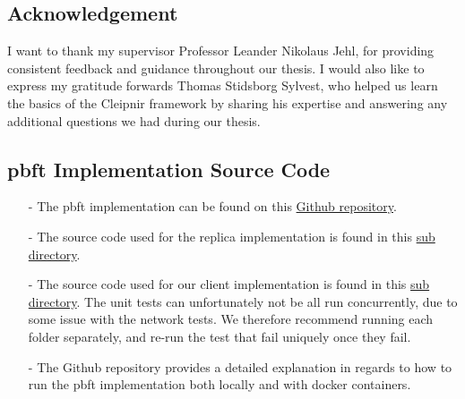 \documentclass[12pt, a4paper]{report}
\numberwithin{figure}{section}
\numberwithin{table}{section}
\begin{document}
	\section*{Acknowledgement}
I want to thank my supervisor Professor Leander Nikolaus Jehl, for providing consistent feedback and guidance throughout our thesis. I would also like to express my gratitude forwards Thomas Stidsborg Sylvest, who helped us learn the basics of the Cleipnir framework by sharing his expertise and answering any additional questions we had during our thesis.	
	
	\newpage		
	
	\printacronyms
	
	\setlength{\parindent}{0em} 
	
	
	
	
	
	
		
	
		
	
		
	
		
	
		
	
	
	
\listoffigures
\lstlistoflistings

\newpage
\begin{appendices}
	\chapter{\ac{pbft} Implementation Source Code}
	\begin{itemize}
		\item[-] The \ac{pbft} implementation can be found on this \href{https://github.com/Lupu2/PBFT-Master}{Github repository}.
		\item[-] The source code used for the replica implementation is found in this \href{https://github.com/Lupu2/PBFT-Master/tree/main/PBFT}{sub directory}.
		\item[-] The source code used for our client implementation is found in this \href{https://github.com/Lupu2/PBFT-Master/tree/main/PBFTClient}{sub directory}. The unit tests can unfortunately not be all run concurrently, due to some issue with the network tests. We therefore recommend running each folder separately, and re-run the test that fail uniquely once they fail. 
		\item[-] The Github repository provides a detailed explanation in regards to how to run the \ac{pbft} implementation both locally and with docker containers. 
	\end{itemize} 
\end{appendices}
\printbibliography[heading=bibintoc]
\end{document}
